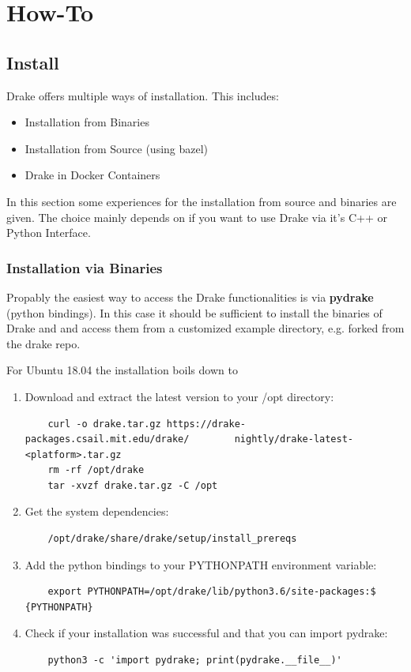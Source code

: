 \section{How-To}
\subsection{Install}
Drake offers multiple ways of installation. This includes:
\begin{itemize}
\item Installation from Binaries
\item Installation from Source (using bazel)
\item Drake in Docker Containers
\end{itemize}
In this section some experiences for the installation from source and binaries are given. The choice mainly depends on if you want to use Drake via it's C++ or Python Interface. 
\subsubsection{Installation via Binaries}
Propably the easiest way to access the Drake functionalities is via \textbf{pydrake} (python bindings). In this case it should be sufficient to install the binaries of Drake and and access them from  a customized example directory, e.g. forked from the drake repo. 

For Ubuntu 18.04 the installation boils down to 
\begin{enumerate}
	\item Download and extract the latest version to your /opt 			directory:
	\begin{verbatim}
	curl -o drake.tar.gz https://drake-packages.csail.mit.edu/drake/		nightly/drake-latest-<platform>.tar.gz
	rm -rf /opt/drake
	tar -xvzf drake.tar.gz -C /opt
	\end{verbatim}
	\item Get the system dependencies:
	\begin{verbatim}
	/opt/drake/share/drake/setup/install_prereqs
	\end{verbatim}
	\item Add the python bindings to your PYTHONPATH environment 			variable:
	\begin{verbatim}
	export PYTHONPATH=/opt/drake/lib/python3.6/site-packages:$				{PYTHONPATH}
	\end{verbatim}
	\item Check if your installation was successful and that you can 	import pydrake:
	\begin{verbatim}
	python3 -c 'import pydrake; print(pydrake.__file__)'
	\end{verbatim}
\end{enumerate}
